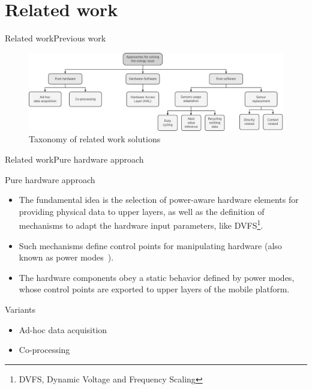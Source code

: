 \documentclass[9pt,xcolor={dvipsnames},handout]{beamer}
\begin{document}
\section{Related work}
\begin{frame}{Related work}{Previous work}
\begin{figure}
  \centering
  \includegraphics[width=\textwidth]{../../../resources/images/vectors/approaches-taxonomy}
  \caption{Taxonomy of related work solutions}
  \label{fig:taxonomy}
\end{figure}
\end{frame}

\begin{frame}{Related work}{Pure hardware approach}
\begin{exampleblock}{Pure hardware approach}
\begin{itemize}
  \item The fundamental idea is the selection of power-aware hardware elements for providing physical data to upper layers, as well as the definition of mechanisms to adapt the hardware input parameters, like DVFS\footnote{DVFS, Dynamic Voltage and Frequency Scaling}.
  \item Such mechanisms define control points for manipulating hardware (also known as power modes~\cite{Ranganathan2010,Lorch1998,Benini2000}).
  \item The hardware components obey a static behavior defined by power modes, whose control points are exported to upper layers of the mobile platform.
\end{itemize}
\end{exampleblock}

\begin{exampleblock}{Variants}
\begin{itemize}
  \item Ad-hoc data acquisition
  \item Co-processing
\end{itemize}
\end{exampleblock}
\end{frame}
\end{document}
